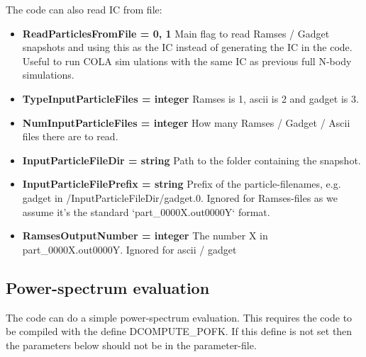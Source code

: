 \documentclass[usenatbib]{article}
\begin{document}
The code can also read IC from file:

\begin{itemize}

\item \textbf{ReadParticlesFromFile = 0, 1} Main flag to read Ramses / Gadget snapshots and using this as the IC instead of generating the IC in the code. Useful to run COLA sim
ulations with the same IC as previous full N-body simulations.

\item \textbf{TypeInputParticleFiles = integer}  Ramses is 1, ascii is 2 and gadget is 3.

\item \textbf{NumInputParticleFiles = integer} How many Ramses / Gadget / Ascii files there are to read.

\item \textbf{InputParticleFileDir = string} Path to the folder containing the snapshot.

\item \textbf{InputParticleFilePrefix = string} Prefix of the particle-filenames, e.g. gadget in /InputParticleFileDir/gadget.0. Ignored for Ramses-files as we assume it's the standard `part\_0000X.out0000Y` format.

\item \textbf{RamsesOutputNumber = integer} The number X in part\_0000X.out0000Y. Ignored for ascii / gadget

\end{itemize}

\subsection*{Power-spectrum evaluation}

The code can do a simple power-spectrum evaluation. This requires the code to be compiled with the define DCOMPUTE\_POFK. If this define is not set then the parameters below should not be in the parameter-file.
\end{document}
